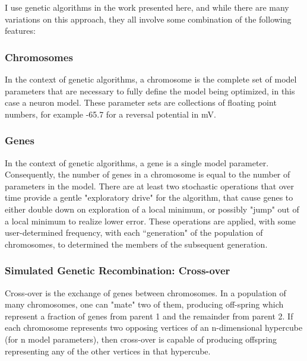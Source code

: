 I use genetic algorithms in the work presented here, and while there are many variations on this approach, they all involve some combination of the following features:
\subsubsection{Chromosomes}
In the context of genetic algorithms, a chromosome is the complete set of model parameters that are necessary to fully define the model being optimized, in this case a neuron model.
These parameter sets are collections of floating point numbers, for example -65.7 for a reversal potential in mV.
\subsubsection{Genes}
In the context of genetic algorithms, a gene is a single model parameter.  Consequently, the number of genes in a chromosome is equal to the number of parameters in the model.
There are at least two stochastic operations that over time provide a gentle "exploratory drive" for the algorithm, that cause genes to either double down on exploration of a local minimum, or possibly "jump" out of a local minimum to realize lower error.  These operations are applied, with some user-determined frequency, with each ``generation" of the population of chromosomes, to determined the members of the subsequent generation.
\subsubsection{Simulated Genetic Recombination: Cross-over}
Cross-over is the exchange of genes between chromosomes.  In a population of many chromosomes, one can "mate" two of them, producing off-spring which represent a fraction of genes from parent 1 and the remainder from parent 2.  If each chromosome represents two opposing vertices of an n-dimensional hypercube (for n model parameters), then cross-over is capable of producing offspring representing any of the other vertices in that hypercube.
